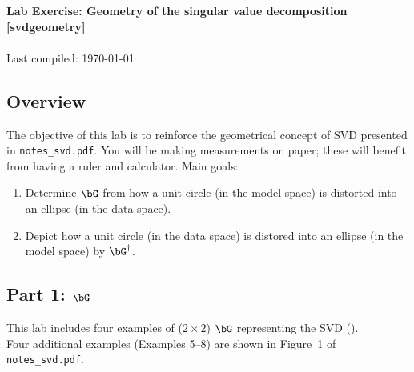 \documentclass[11pt,titlepage,fleqn]{article}
\newcommand{\nfile}{{\tt notes\_svd.pdf}}
\begin{document}

\begin{spacing}{1.2}
\centering
{\large \bf Lab Exercise: Geometry of the singular value decomposition [svdgeometry]} \\
\cltag\ \\
Last compiled: \today
\end{spacing}



\subsection*{Overview}

The objective of this lab is to reinforce the geometrical concept of SVD \citep{TrefethenBau} presented in \nfile. You will be making measurements on paper; these will benefit from having a ruler and calculator. Main goals:
%
\begin{enumerate}
\item Determine $\bG$ from how a unit circle (in the model space) is distorted into an ellipse (in the data space).
\item Depict how a unit circle (in the data space) is distored into an ellipse (in the model space) by $\bG^{\dagger}$.
\end{enumerate}


\subsection*{Part 1: $\bG$}

This lab includes four examples of ($2 \times 2$) $\bG$ representing the SVD (). \\
Four additional examples (Examples 5--8) are shown in Figure~1 of \nfile.
\end{document}
